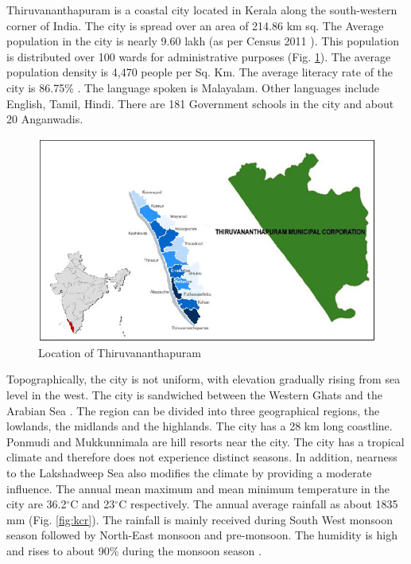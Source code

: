 \documentclass[12pt,a4paper]{report}
\begin{document}
Thiruvananthapuram is a coastal city located in Kerala along the south-western corner of India. The city is spread over an area of 214.86 km sq. The Average population in the city is nearly 9.60 lakh (as per Census 2011 \cite{census}). This population is distributed over 100 wards for administrative purposes (Fig. \ref{fig:wardmapoftvm}). The average population density is 4,470 people per Sq. Km. The average literacy rate of the city is 86.75\% \cite{census}. The language spoken is Malayalam. Other languages include English, Tamil, Hindi. There are 181 Government schools in the city and about 20 Anganwadis.

\begin{figure}[H]
	\centering
	\includegraphics[width=0.85\linewidth]{ward_map_of_tvm}
	\caption{Location of Thiruvananthapuram}
	\label{fig:wardmapoftvm}
\end{figure}

Topographically, the city is not uniform, with elevation gradually rising from sea level in the west. The city is sandwiched between the Western Ghats and the Arabian Sea \cite{topo}. The region can be divided into three geographical regions, the lowlands, the midlands and the highlands. The city has a 28 km long coastline. Ponmudi and Mukkunnimala are hill resorts near the city.
The city has a tropical climate and therefore does not experience distinct seasons. In addition, nearness to the Lakshadweep Sea also modifies the climate by providing a moderate influence. The annual mean maximum and mean minimum temperature in the city are 36.2$^\circ$C and 23$^\circ$C respectively. The annual average rainfall as about 1835 mm (Fig. \ref{fig:kcr}). The rainfall is mainly received during South West monsoon season followed by North-East monsoon and pre-monsoon. The humidity is high and rises to about 90\% during the monsoon season \cite{rain}.
	
\end{document}
